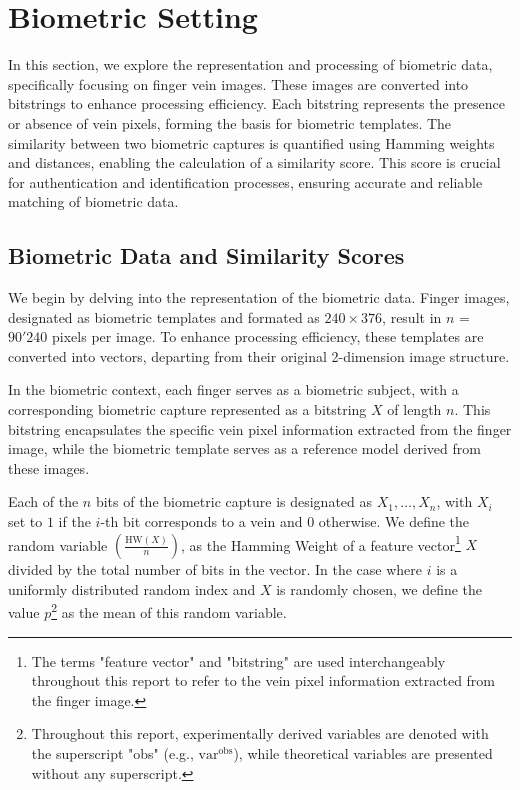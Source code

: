 

\section{Biometric Setting}
\label{sec:bio_setting}

In this section, we explore the representation and processing of biometric data, specifically focusing on finger vein images. These images are converted into bitstrings to enhance processing efficiency. Each bitstring represents the presence or absence of vein pixels, forming the basis for biometric templates. The similarity between two biometric captures is quantified using Hamming weights and distances, enabling the calculation of a similarity score. This score is crucial for authentication and identification processes, ensuring accurate and reliable matching of biometric data.

\subsection{Biometric Data and Similarity Scores}
\label{Bio_data_sim_scores}
We begin by delving into the representation of the biometric data. Finger images, designated as biometric templates and formated as \(240 \times 376\), result in \(n\) = \(90'240\) pixels per image. To enhance processing efficiency, these templates are converted into vectors, departing from their original 2-dimension image structure. 

In the biometric context, each finger serves as a biometric subject, with a corresponding biometric capture represented as a bitstring \(X\) of length \(n\). This bitstring encapsulates the specific vein pixel information extracted from the finger image, while the biometric template serves as a reference model derived from these images. 

Each of the \(n\) bits of the biometric capture is designated as \(X_1, \ldots, X_n\), with \(X_i\) set to \(1\) if the \(i\)-th bit corresponds to a vein and \(0\) otherwise. We define the random variable \(\left( \frac{\text{HW}(X)}{n} \right)\), as the Hamming Weight of a feature vector\footnote{The terms "feature vector" and "bitstring" are used interchangeably throughout this report to refer to the vein pixel information extracted from the finger image.} \(X\) divided by the total number of bits in the vector. In the case where \(i\) is a uniformly distributed random index and \(X\) is randomly chosen, we define the value \(p\)\footnote{Throughout this report, experimentally derived variables are denoted with the superscript "obs" (e.g., \(\text{var}^{\text{obs}}\)), while theoretical variables are presented without any superscript.} as the mean of this random variable.


